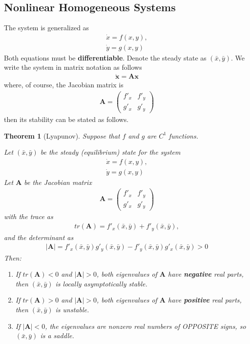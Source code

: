 \documentclass[11pt,a4paper]{book}
\newtheorem{theorem}{Theorem}[section]
\theoremstyle{definition}\newtheorem{definition}{Definition}
\theoremstyle{definition}\newtheorem{fact}{Fact}
\theoremstyle{definition}\newtheorem{remark}{Remark}
\theoremstyle{definition}\newtheorem{ex}{Ex.}
\theoremstyle{definition}\newtheorem{project}{Project}
\theoremstyle{definition}\newtheorem{problem}{Problem}
\theoremstyle{definition}\newtheorem{example}{Example}
\newenvironment{ftheorem}
{\begin{mdframed}\begin{theorem}}
		{\end{theorem}\end{mdframed}}
\numberwithin{theorem}{section}
\numberwithin{corollary}{chapter}
\numberwithin{assumption}{chapter}
\numberwithin{definition}{chapter}
\numberwithin{prop}{chapter}
\numberwithin{notation}{chapter}
\numberwithin{problem}{chapter}
\numberwithin{example}{chapter}
\numberwithin{fact}{chapter}
\numberwithin{ex}{chapter}
\def\A{\mathbf A}
\def\x{\mathbf x}
\begin{document}
	\subsection{Nonlinear Homogeneous Systems}
	The system is generalized as
	\begin{align*}
		\dot{x} = f(x,y), \\
		\dot{y} = g(x,y)
	\end{align*}
	Both equations must be \textbf{differentiable}. Denote the steady state as $(\bar{x}, \bar{y})$. We write the system in matrix notation as follows
	\begin{align*}
		\dot{\x} = \A \x 
	\end{align*}
	where, of course, the Jacobian matrix is 
	\begin{align*}
		\A = \begin{pmatrix}
			 f'_x & f'_y \\ g'_x & g'_y
		\end{pmatrix}
	\end{align*}
	then its stability can be stated as follows.
	\begin{ftheorem}[Lyapunov]
		Suppose that $f$ and $g$ are $C^1$ functions.
		
		Let $(\bar{x}, \bar{y})$ be the steady (equilibrium) state for the system
		\begin{align*}
		\dot{x} = f(x,y), \\
		\dot{y} = g(x,y)
	\end{align*}
		Let $\A$ be the Jacobian matrix 
	\begin{align*}
		\A = \begin{pmatrix}
			 f'_x & f'_y \\ g'_x & g'_y
		\end{pmatrix}
	\end{align*}
	with the trace as
	\begin{align*}
		tr(\A) = f'_x (\bar{x}, \bar{y}) + f'_y (\bar{x}, \bar{y}),
	\end{align*}
	and the determinant as
	\begin{align*}
		|\A| = f'_x (\bar{x}, \bar{y}) g'_y (\bar{x}, \bar{y}) - f'_y (\bar{x}, \bar{y}) g'_x (\bar{x}, \bar{y}) > 0
	\end{align*}
	Then:
	\begin{enumerate}
		\item If $tr(\A) < 0$ and $|\A| > 0$, both eigenvalues of $\A$ have \textbf{negative} real parts, then $(\bar{x}, \bar{y})$ is locally asymptotically stable.
		\item If $tr(\A) > 0$ and $|\A| > 0$, both eigenvalues of $\A$ have \textbf{positive} real parts, then $(\bar{x}, \bar{y})$ is unstable.
		\item If $|\A| < 0$, the eigenvalues are nonzero real numbers of OPPOSITE signs, so $(\bar{x}, \bar{y})$ is a saddle.
	\end{enumerate}
	\end{ftheorem}
	
\end{document}
